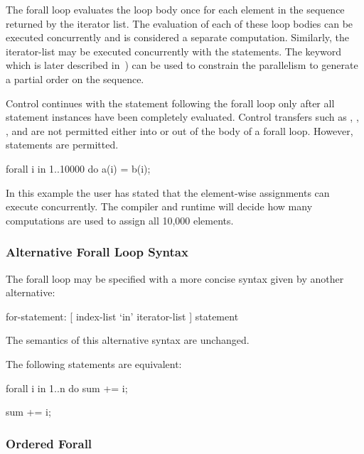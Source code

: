 The forall loop evaluates the loop body once for each element in the
sequence returned by the iterator list. The evaluation of each of
these loop bodies can be executed concurrently and is considered a
separate computation. Similarly, the iterator-list may be executed
concurrently with the statements. The keyword  which is
later described in~) can be used to constrain
the parallelism to generate a partial order on the sequence.

Control continues with the statement following the forall loop only
after all statement instances have been completely evaluated.
Control transfers such as , , ,
and  are not permitted either into or out of the body of
a forall loop.  However,  statements are permitted.

\begin{example}
\begin{chapel}
forall i in 1..10000 do
  a(i) = b(i);
\end{chapel}
In this example the user has stated that the element-wise assignments can
execute concurrently. The compiler and runtime will decide how many
computations are used to assign all 10,000 elements.
\end{example}

\subsubsection{Alternative Forall Loop Syntax}
\label{Alternative_Forall_Loop_Syntax}

The forall loop may be specified with a more concise syntax given by
another alternative:
\begin{syntax}
for-statement:
  [ index-list `in' iterator-list ] statement
\end{syntax}
The semantics of this alternative syntax are unchanged.

\begin{example}
The following statements are equivalent:
\begin{chapel}
forall i in 1..n do
  sum += i;
\end{chapel}
\begin{chapel}
[i in 1..n] sum += i;
\end{chapel}
\end{example}

\subsubsection{Ordered Forall}
\label{Ordered_Forall}

